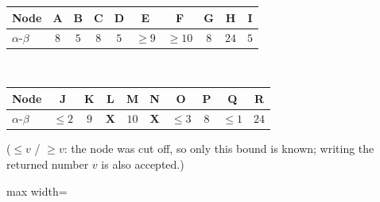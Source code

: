 \documentclass[11pt,a4paper]{article}
\begin{document}
\begin{solbox}
\begin{center}\small \begin{tabular}{|l|c|c|c|c|c|c|c|c|c|}\hline
\textbf{Node} & \textbf{A} & \textbf{B} & \textbf{C} & \textbf{D} & \textbf{E} & \textbf{F} & \textbf{G} & \textbf{H} & \textbf{I}\\ \hline
$\alpha$-$\beta$ & \textcolor{blue!60!black}{$8$} & \textcolor{blue!60!black}{$5$} & \textcolor{blue!60!black}{$8$} & \textcolor{blue!60!black}{$5$} & \textcolor{blue!60!black}{$\ge 9$} & \textcolor{blue!60!black}{$\ge 10$} & \textcolor{blue!60!black}{$8$} & \textcolor{blue!60!black}{$24$} & \textcolor{blue!60!black}{$5$}\\[1.5mm] \hline
\end{tabular}\\[2mm]\begin{tabular}{|l|c|c|c|c|c|c|c|c|c|}\hline
\textbf{Node} & \textbf{J} & \textbf{K} & \textbf{L} & \textbf{M} & \textbf{N} & \textbf{O} & \textbf{P} & \textbf{Q} & \textbf{R}\\ \hline
$\alpha$-$\beta$ & \textcolor{blue!60!black}{$\le 2$} & \textcolor{blue!60!black}{$9$} & \textcolor{red!70!black}{\textbf{X}} & \textcolor{blue!60!black}{$10$} & \textcolor{red!70!black}{\textbf{X}} & \textcolor{blue!60!black}{$\le 3$} & \textcolor{blue!60!black}{$8$} & \textcolor{blue!60!black}{$\le 1$} & \textcolor{blue!60!black}{$24$}\\[1.5mm] \hline
\end{tabular}\end{center}($\le v$ / $\ge v$: the node was cut off, so only this bound is known; writing the returned number $v$ is also accepted.)\begin{center}
\begin{adjustbox}{max width=\linewidth}
\end{adjustbox}
\end{center}
\end{solbox}
\end{document}
